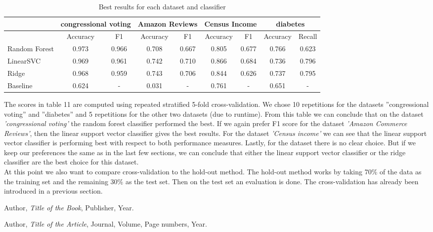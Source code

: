 \documentclass[a4paper,12pt]{article}
\begin{document}
\begin{table}[h!]
\centering
\footnotesize
\begin{tabular}{|l|c|c|c|c|c|c|c|c|}
\hline
& \multicolumn{2}{c|}{congressional voting} & \multicolumn{2}{c|}{Amazon Reviews} & \multicolumn{2}{c|}{Census Income} & \multicolumn{2}{c|}{diabetes} \\
\hline
& Accuracy & F1 & Accuracy & F1 & Accuracy & F1 & Accuracy & Recall \\
\hline
Random Forest & 0.973 & 0.966 & 0.708 & 0.667 & 0.805 & 0.677 & 0.766 & 0.623 \\
\hline
LinearSVC & 0.969 & 0.961 & 0.742 & 0.710 & 0.866 & 0.684 & 0.736 & 0.796 \\
\hline
Ridge & 0.968 & 0.959 & 0.743 & 0.706 & 0.844 & 0.626 & 0.737 & 0.795 \\
\hline
Baseline & 0.624 & - & 0.031 & - & 0.761 & - & 0.651 & - \\
\hline
\end{tabular}
\vspace{0.3cm}
\caption{Best results for each dataset and classifier}
\label{tab:best_results}
\end{table}
The scores in table 11 are computed using repeated stratified 5-fold
cross-validation. We chose 10 repetitions for the datasets ”congressional voting” and ”diabetes” and 5
repetitions for the other two datasets (due to runtime).
From this table we can conclude that on the dataset \textit{'congressional voting'} the random forest classifier
performed the best. If we again prefer F1 score for the dataset \textit{'Amazon Commerce Reviews'}, then the
linear support vector classifier gives the best results. For the dataset \textit{'Census income'} we can see that
the linear support vector classifier is performing best with respect to both performance measures. Lastly,
for the  dataset there is no clear choice. But if we keep our preferences the same as in the
last few sections, we can conclude that either the linear support vector classifier or the ridge classifier
are the best choice for this dataset. \\
At this point we also want to compare cross-validation to the hold-out method. 
The hold-out method works by taking 70\% of the data as the training set and the remaining 30\% as the test set.
Then on the test set an evaluation is done. The cross-validation has already been introduced in a previous section.



\begin{thebibliography}{9}
Author, \textit{Title of the Book}, Publisher, Year.

Author, \textit{Title of the Article}, Journal, Volume, Page numbers, Year.
\end{thebibliography}
\end{document}
